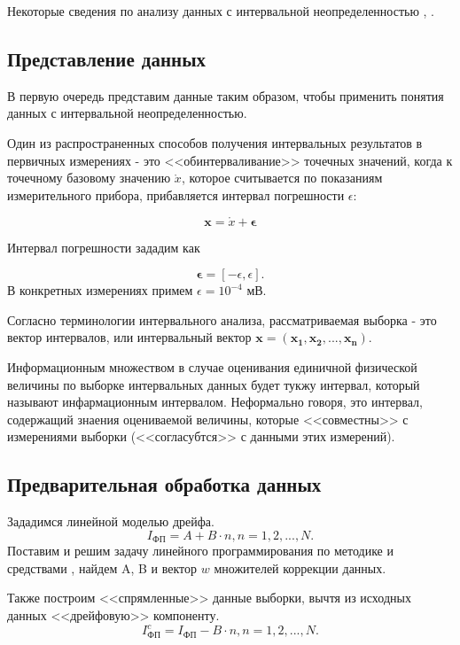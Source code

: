 Некоторые сведения по анализу данных с интервальной неопределенностью \cite{litlink2}, \cite{litlink3}.
\subsection{Представление данных}
В первую очередь представим данные таким образом, чтобы применить понятия данных с интервальной неопределенностью.

Один из распространенных способов получения интервальных результатов в первичных измерениях - это <<обинтерваливание>> точечных значений, когда к точечному базовому значению $\mathring{x}$, которое считывается по показаниям измерительного прибора, прибавляется интервал погрешности $\epsilon$:

\begin{equation}
    \boldsymbol{x} = \mathring{x} + \boldsymbol{\epsilon}
\end{equation}

Интервал погрешности зададим как

\begin{equation*}
    \boldsymbol{\epsilon} = [-\epsilon, \epsilon].
\end{equation*}
В конкретных измерениях примем $\epsilon = 10^{-4}$ мВ.

Согласно терминологии интервального анализа, рассматриваемая выборка - это вектор интервалов, или интервальный вектор $\boldsymbol{x} = (\boldsymbol{x_1}, \boldsymbol{x_2}, ..., \boldsymbol{x_n}).$

Информационным множеством в случае оценивания единичной физической величины по выборке интервальных данных будет тукжу интервал, который называют инфармационным интервалом. Неформально говоря, это интервал, содержащий знаения оцениваемой величины, которые <<совместны>> с измерениями выборки (<<согласубтся>> с данными этих измерений).

\subsection{Предварительная обработка данных}
Зададимся линейной моделью дрейфа.
\begin{equation}
    I_{\text{ФП}} = A + B\cdot n, n = 1, 2, ..., N.
\end{equation}
Поставим и решим задачу линейного программирования по методике и средствами \cite{litlink5}, найдем A, B и вектор $w$ множителей коррекции данных.

Также построим <<спрямленные>> данные выборки, вычтя из исходных данных <<дрейфовую>> компоненту.
\begin{equation}
    I_{\text{ФП}}^c = I_{\text{ФП}} - B \cdot n, n = 1, 2, ..., N.
\end{equation}

